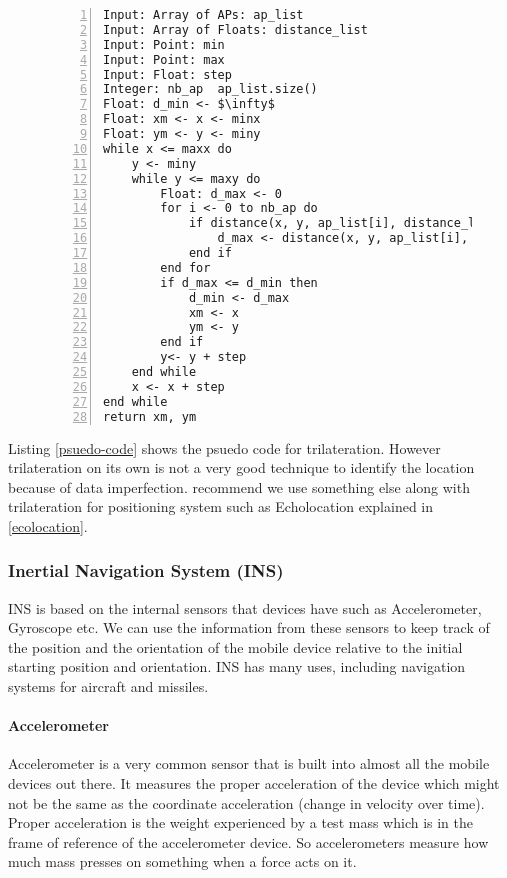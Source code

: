 \begin{figure}[H]
\begin{lstlisting}[caption = {Algorithm for Trilateration\cite{sig-cart}},frame=single,mathescape, captionpos=b,numbers=left,numbersep=5pt,label={psuedo-code}]
Input: Array of APs: ap_list
Input: Array of Floats: distance_list
Input: Point: min
Input: Point: max
Input: Float: step
Integer: nb_ap  ap_list.size()
Float: d_min <- $\infty$
Float: xm <- x <- minx
Float: ym <- y <- miny
while x <= maxx do
    y <- miny
    while y <= maxy do
        Float: d_max <- 0
        for i <- 0 to nb_ap do
            if distance(x, y, ap_list[i], distance_list[i]) > d_max then
                d_max <- distance(x, y, ap_list[i], distance_list[i])
            end if
        end for
        if d_max <= d_min then
            d_min <- d_max
            xm <- x
            ym <- y
        end if
        y<- y + step
    end while
    x <- x + step
end while
return xm, ym
\end{lstlisting}
\end{figure}

Listing \ref{psuedo-code} shows the psuedo code for trilateration. However trilateration on its own is not a very good technique to identify the location because of data imperfection. \citeauthor{trilat-fusion} recommend we use something else along with trilateration for positioning system\cite{trilat-fusion}  such as Echolocation explained in \ref{ecolocation}.
\subsubsection{Inertial Navigation System (INS)}

INS\cite{innertial_nav_sys} is based on the internal sensors that devices have
such as Accelerometer, Gyroscope etc. We can use the information from
these sensors to keep track of the position and the orientation of
the mobile device relative to the initial starting position and orientation. INS has many uses, including navigation systems for
aircraft and missiles\cite{ins-wiki}.


\paragraph{Accelerometer} \label{accelerometer}

Accelerometer\cite{accl-guide} is a very common sensor that is built into almost
all the mobile devices out there. It measures the proper acceleration
of the device which might not be the same as the coordinate acceleration
(change in velocity over time). Proper acceleration is the weight
experienced by a test mass which is in the frame of reference
of the accelerometer device. So accelerometers measure how much mass
presses on something when a force acts on it.

